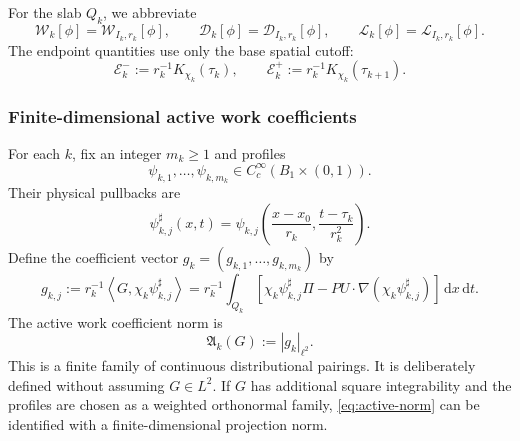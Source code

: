 \documentclass[10pt,a4paper]{amsart}
\numberwithin{equation}{section}
\newcommand{\dxdt}{\,\mathrm dx\,\mathrm dt}
\newcommand{\pair}[2]{\left\langle #1,#2\right\rangle}
\newcommand{\W}{\mathcal W}
\newcommand{\D}{\mathcal D}
\newcommand{\Lk}{\mathcal L}
\newcommand{\Ek}{\mathcal E}
\newcommand{\Aact}{\mathfrak A}
\begin{document}
For the slab \(Q_k\), we abbreviate
\[
\W_k[\phi]=\W_{I_k,r_k}[\phi],
\qquad
\D_k[\phi]=\D_{I_k,r_k}[\phi],
\qquad
\Lk_k[\phi]=\Lk_{I_k,r_k}[\phi].
\]
The endpoint quantities use only the base spatial cutoff:
\begin{equation}\label{eq:E-endpoints}
\Ek_k^-:=r_k^{-1}K_{\chi_k}(\tau_k),
\qquad
\Ek_k^+:=r_k^{-1}K_{\chi_k}(\tau_{k+1}).
\end{equation}

\subsubsection{Finite-dimensional active work coefficients}

For each \(k\), fix an integer \(m_k\ge1\) and profiles
\begin{equation}\label{eq:profiles}
\psi_{k,1},\ldots,\psi_{k,m_k}
\in C_c^\infty(B_1\times(0,1)).
\end{equation}
Their physical pullbacks are
\begin{equation}\label{eq:pullback}
\psi_{k,j}^\sharp(x,t)
=
\psi_{k,j}\left(
\frac{x-x_0}{r_k},
\frac{t-\tau_k}{r_k^2}
\right).
\end{equation}
Define the coefficient vector \(g_k=(g_{k,1},\ldots,g_{k,m_k})\) by
\begin{equation}\label{eq:gcoeff}
g_{k,j}
:=
r_k^{-1}\pair{G}{\chi_k\psi_{k,j}^\sharp}
=
r_k^{-1}\int_{Q_k}
\left[
\chi_k\psi_{k,j}^\sharp\Pi
-
PU\cdot\nabla(\chi_k\psi_{k,j}^\sharp)
\right]\dxdt.
\end{equation}
The active work coefficient norm is
\begin{equation}\label{eq:active-norm}
\Aact_k(G):=|g_k|_{\ell^2}.
\end{equation}
This is a finite family of continuous distributional pairings. It is deliberately defined without assuming \(G\in L^2\). If \(G\) has additional square integrability and the profiles are chosen as a weighted orthonormal family, \eqref{eq:active-norm} can be identified with a finite-dimensional projection norm.
\end{document}
